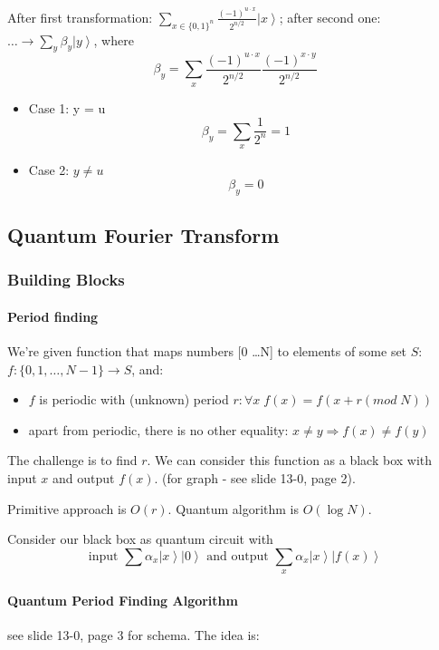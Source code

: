 \documentclass{scrartcl}
\newcommand{\ket}[1]{\left| #1 \right>} %
\newcommand{\means}{\Rightarrow} %
\begin{document}
After first transformation: $\sum \limits_{x \in \{0, 1\}^n} \frac{(-1)^{u \cdot
    x}}{2^{n/2}} \ket x$; after second one: $\dots \to \sum \limits_y \beta_y
\ket y$, where
$$ \beta_y = \sum_x \frac{(-1)^{u\cdot x}}{2^{n/2}} \frac{(-1)^{x\cdot y}}{2^{n/2}}$$
\begin{itemize}
\item Case 1: y = u
$$ \beta_y = \sum_x \frac1{2^n} = 1$$
\item Case 2: $y \neq u$
$$ \beta_y = 0$$
\end{itemize}

\subsection{Quantum Fourier Transform}
\label{sec:QuantumFourierTransform}

\subsubsection{Building Blocks}

\paragraph{Period finding}

We're given function that maps numbers [0 \dots N] to elements of some set $S$:
$f : \{0, 1, \dots, N-1\} \to S$, and:
\begin{itemize}
\item $f$ is periodic with (unknown) period $r: \forall x \; f(x) = f(x + r
  (mod\; N))$
\item apart from periodic, there is no other equality: $x \neq y \means f(x)
  \neq f(y)$
\end{itemize}

The challenge is to find $r$. We can consider this function as a black box with
input $x$ and output $f(x)$. (for graph - see slide 13-0, page 2).

Primitive approach is $O(r)$. Quantum algorithm is $O(\log N)$.

Consider our black box as quantum circuit with $$\text {input } \sum \alpha_x
\ket x \ket0 \text{ and output } \sum \limits_x \alpha_x \ket x \ket{f(x)}$$

\paragraph{Quantum Period Finding Algorithm}

see slide 13-0, page 3 for schema. The idea is:
\end{document}
